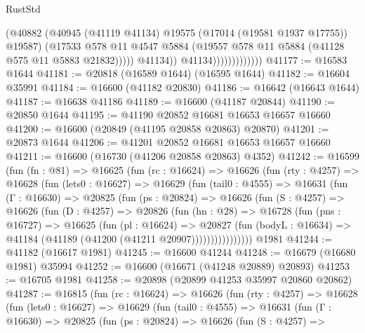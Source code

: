 \begin{lexlean}{RustStd}
\begin{coremodule}
                                    (@40882
                                      (@40945
                                        (@41119 @41134)
                                        @19575
                                        (@17014 (@19581 @1937 @17755))
                                        @19587)
                                      (@17533
                                        @578
                                        @11
                                        @4547
                                        @5884
                                        (@19557 @578 @11 @5884 (@41128 @575 @11 @5883 @21832)))))
                                  @41134))
                              @41134)))))))))))))
@41177 := @16583 @1644
@41181 := @20818 (@16589 @1644) (@16595 @1644)
@41182 := @16604 @35991
@41184 := @16600 (@41182 @20830)
@41186 := @16642 (@16643 @1644)
@41187 := @16638 @41186
@41189 := @16600 (@41187 @20844)
@41190 := @20850 @1644
@41195 := @41190 @20852 @16681 @16653 @16657 @16660
@41200 := @16600 (@20849 (@41195 @20858 @20863) @20870)
@41201 := @20873 @1644
@41206 := @41201 @20852 @16681 @16653 @16657 @16660
@41211 := @16600 (@16730 (@41206 @20858 @20863) @4352)
@41242 := @16599
    (fun (fn : @81) =>
    @16625
      (fun (rc : @16624) =>
      @16626
        (fun (rty : @4257) =>
        @16628
          (fun (lets0 : @16627) =>
          @16629
            (fun (tail0 : @4555) =>
            @16631
              (fun (Γ : @16630) =>
              @20825
                (fun (ps : @20824) =>
                @16626
                  (fun (S : @4257) =>
                  @16626
                    (fun (D : @4257) =>
                    @20826
                      (fun (hn : @28) =>
                      @16728
                        (fun (pns : @16727) =>
                        @16625
                          (fun (pl : @16624) =>
                          @20827
                            (fun (bodyL : @16634) =>
                            @41184 (@41189 (@41200 (@41211 @20907))))))))))))))))
    @1981
@41244 := @41182 (@16617 @1981)
@41245 := @16600 @41244
@41248 := @16679 (@16680 @1981) @35994
@41252 := @16600 (@16671 (@41248 @20889) @20893)
@41253 := @16705 @1981
@41258 := @20898 (@20899 @41253 @35997 @20860 @20862)
@41287 := @16815
    (fun (rc : @16624) =>
    @16626
      (fun (rty : @4257) =>
      @16628
        (fun (lets0 : @16627) =>
        @16629
          (fun (tail0 : @4555) =>
          @16631
            (fun (Γ : @16630) =>
            @20825
              (fun (ps : @20824) =>
              @16626
                (fun (S : @4257) =>

\end{coremodule}
\end{lexlean}
